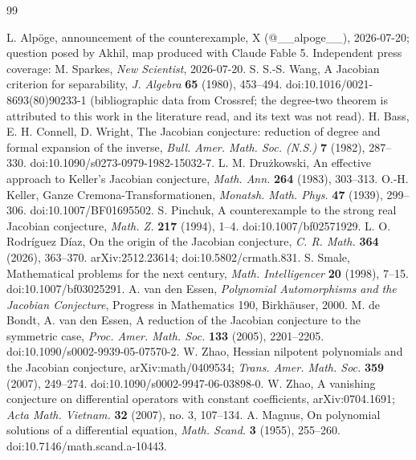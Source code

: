 \documentclass[11pt]{article}
\theoremstyle{definition}
\theoremstyle{remark}
\begin{document}
\begin{thebibliography}{99}
\raggedright
{} L. Alp\"oge, announcement of the counterexample, X (@\_\_alpoge\_\_),
2026-07-20; question posed by Akhil, map produced with Claude Fable 5. Independent press %
coverage: M. Sparkes, \emph{New Scientist}, 2026-07-20.
 S. S.-S. Wang, A Jacobian criterion for separability, \emph{J. Algebra} \textbf{65} (1980), 453--494.
doi:10.1016/0021-8693(80)90233-1 (bibliographic data from Crossref; the degree-two theorem is attributed to this work in the literature read, and its text was not read).
 H. Bass, E. H. Connell, D. Wright, The Jacobian conjecture: reduction of
degree and formal expansion of the inverse, \emph{Bull. Amer. Math. Soc. (N.S.)} \textbf{7}
(1982), 287--330. doi:10.1090/s0273-0979-1982-15032-7.
 L. M. Dru\.zkowski, An effective approach to Keller's Jacobian
conjecture, \emph{Math. Ann.} \textbf{264} (1983), 303--313.
 O.-H. Keller, Ganze Cremona-Transformationen, \emph{Monatsh. Math. Phys.}
\textbf{47} (1939), 299--306. doi:10.1007/BF01695502.
 S. Pinchuk, A counterexample to the strong real Jacobian conjecture,
\emph{Math. Z.} \textbf{217} (1994), 1--4. doi:10.1007/bf02571929.
 L. O. Rodr\'iguez D\'iaz, On the origin of the Jacobian conjecture,
\emph{C. R. Math.} \textbf{364} (2026), 363--370. arXiv:2512.23614; doi:10.5802/crmath.831.
 S. Smale, Mathematical problems for the next century, \emph{Math.
Intelligencer} \textbf{20} (1998), 7--15. doi:10.1007/bf03025291.
 A. van den Essen, \emph{Polynomial Automorphisms and the Jacobian
Conjecture}, Progress in Mathematics 190, Birkh\"auser, 2000.
 M. de Bondt, A. van den Essen, A reduction of the Jacobian conjecture to
the symmetric case, \emph{Proc. Amer. Math. Soc.} \textbf{133} (2005), 2201--2205. doi:10.1090/s0002-9939-05-07570-2.
 W. Zhao, Hessian nilpotent polynomials and the Jacobian conjecture,
arXiv:math/0409534; \emph{Trans. Amer. Math. Soc.} \textbf{359} (2007), 249--274. doi:10.1090/s0002-9947-06-03898-0.
 W. Zhao, A vanishing conjecture on differential operators with constant
coefficients, arXiv:0704.1691; \emph{Acta Math. Vietnam.} \textbf{32} (2007), no. 3, 107--134.
 A. Magnus, On polynomial solutions of a differential equation,
\emph{Math. Scand.} \textbf{3} (1955), 255--260. doi:10.7146/math.scand.a-10443.

\end{thebibliography}
\end{document}
